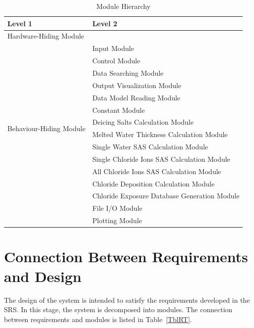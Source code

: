 \documentclass[12pt, titlepage]{article}
\begin{document}
\begin{table}[h!]
\centering
\begin{tabular}{p{} p{}}
\toprule
\textbf{Level 1} & \textbf{Level 2}\\
\midrule

{Hardware-Hiding Module} & ~ \\
\midrule

\multirow{14}{0.3\textwidth}{Behaviour-Hiding Module} & Input Module\\
& Control Module\\
& Data Searching Module\\
& Output Visualization Module\\
& Data Model Reading Module \\
& Constant Module \\
& Deicing Salts Calculation Module \\
& Melted Water Thickness Calculation Module \\
& Single Water SAS Calculation Module \\
& Single Chloride Ions SAS Calculation Module \\
& All Chloride Ions SAS Calculation Module \\
& Chloride Deposition Calculation Module \\
& Chloride Exposure Database Generation Module\\
\midrule

\multirow{2}{0.3\textwidth}{Software Decision Module} &  File I/O Module \\
& Plotting Module \\
\bottomrule

\end{tabular}
\caption{Module Hierarchy}
\label{TblMH}
\end{table}

\section{Connection Between Requirements and Design} \label{SecConnection}

The design of the system is intended to satisfy the requirements developed in
the SRS. In this stage, the system is decomposed into modules. The connection
between requirements and modules is listed in Table~\ref{TblRT}. 

\end{document}
